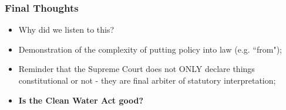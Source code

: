 \documentclass[aspectratio=169]{beamer}
\theoremstyle{principle}
\begin{document}
\begin{frame}
\frametitle{Final Thoughts}

\begin{itemize}
\item Why did we listen to this?
\bigskip
\bigskip
\item Demonstration of the complexity of putting policy into law (e.g. ``from");
\bigskip
\bigskip
\item Reminder that the Supreme Court does not ONLY declare things constitutional or not - they are final arbiter of statutory interpretation;
\bigskip
\bigskip
\item \textbf{Is the Clean Water Act good?}

\end{itemize}

\end{frame}
\end{document}
